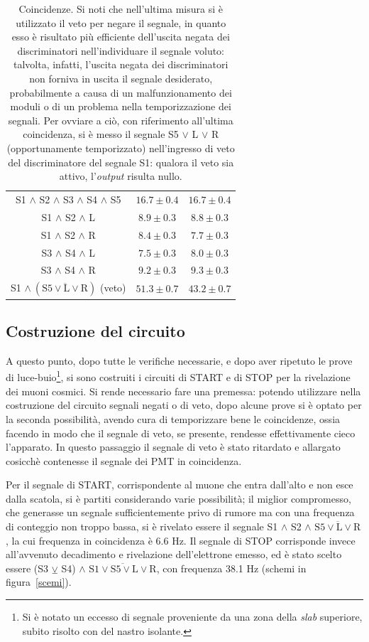 \documentclass[10pt, oneside, a4paper]{article}   	%
\begin{document}
\begin{table}[H]
\begin{tabular}{ccc}
		S1 $\wedge$ S2 $\wedge$ S3 $\wedge$ S4 $\wedge$ S5	& $16.7 \pm 0.4$	& $16.7 \pm 0.4$ \\	
		S1 $\wedge$ S2 $\wedge$ L				& $8.9 \pm 0.3$		& $8.8 \pm 0.3$	\\
		S1 $\wedge$ S2 $\wedge$ R				& $8.4 \pm 0.3$		& $7.7 \pm 0.3$	\\
		S3 $\wedge$ S4 $\wedge$ L				& $7.5 \pm 0.3$		& $8.0 \pm 0.3$	\\
		S3 $\wedge$ S4 $\wedge$ R				& $9.2 \pm 0.3$ 	& $9.3 \pm 0.3$	\\
		S1 $\wedge \ (\overline{\mbox{S5}\vee \mbox{L} \vee \mbox{R}})$ (veto)	& $51.3 \pm 0.7$	& $43.2 \pm 0.7$	\\
		\bottomrule
	\end{tabular}
	\caption{Coincidenze. 
	Si noti che nell'ultima misura si è utilizzato il veto per negare il segnale, in quanto esso è risultato più efficiente dell'uscita negata dei discriminatori nell'individuare il segnale voluto: talvolta, infatti, l'uscita negata dei discriminatori non forniva in uscita il segnale desiderato, probabilmente a causa di un malfunzionamento dei moduli o di un problema nella temporizzazione dei segnali. Per ovviare a ciò, con riferimento all'ultima coincidenza, si è messo il segnale S5 $\vee$ L $\vee$ R (opportunamente temporizzato) nell'ingresso di veto del discriminatore del segnale S1: qualora il veto sia attivo, l'\textit{output} risulta nullo.}
	\label{coincidenze}
\end{table}
%
\subsection{Costruzione del circuito}\label{circuito}
A questo punto, dopo tutte le verifiche necessarie, e dopo aver ripetuto le prove di luce-buio\footnote{Si è notato un eccesso di segnale proveniente da una zona della \emph{slab} superiore, subito risolto con del nastro isolante.}, si sono costruiti i circuiti di START e di STOP per la rivelazione dei muoni cosmici. Si rende necessario fare una premessa: potendo utilizzare nella costruzione del circuito segnali negati o di veto, dopo alcune prove si è optato per la seconda possibilità, avendo cura di temporizzare bene le coincidenze, ossia facendo in modo che il segnale di veto, se presente, rendesse effettivamente cieco l'apparato. In questo passaggio il segnale di veto è stato ritardato e allargato cosicchè contenesse il segnale dei PMT in coincidenza.

Per il segnale di START, corrispondente al muone che entra dall'alto e non esce dalla scatola, si è partiti considerando varie possibilità; il miglior compromesso, che generasse un segnale sufficientemente privo di rumore ma con una frequenza di conteggio non troppo bassa, si è rivelato essere il segnale S1 $\wedge$ S2  $\wedge$ $\overline{\mbox{S5}\vee \mbox{L} \vee \mbox{R}}$ , la cui frequenza in coincidenza è 6.6 Hz.
Il segnale di STOP corrisponde invece all'avvenuto decadimento e rivelazione dell'elettrone emesso, ed è stato scelto essere (S3 $\veebar$ S4)  $\wedge$ $\overline{\mbox{S1} \vee \mbox{S5}\vee \mbox{L} \vee \mbox{R}}$, con frequenza 38.1 Hz (schemi in figura~\ref{scemi}).
\end{document}

